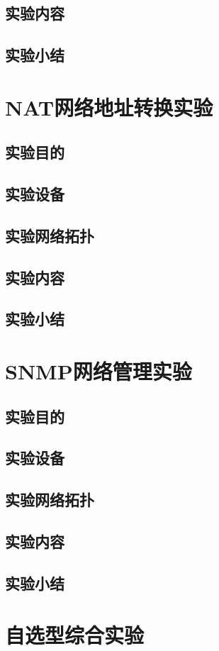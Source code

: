 \documentclass[lang=cn,11pt,a4paper,cite=authoryear]{elegantpaper}
\begin{document}
\subsection{实验内容}
\subsection{实验小结}
\section{NAT网络地址转换实验}
\subsection{实验目的}
\subsection{实验设备}
\subsection{实验网络拓扑}
\subsection{实验内容}
\subsection{实验小结}
\section{SNMP网络管理实验}
\subsection{实验目的}
\subsection{实验设备}
\subsection{实验网络拓扑}
\subsection{实验内容}
\subsection{实验小结}
\section{自选型综合实验}
\end{document}

